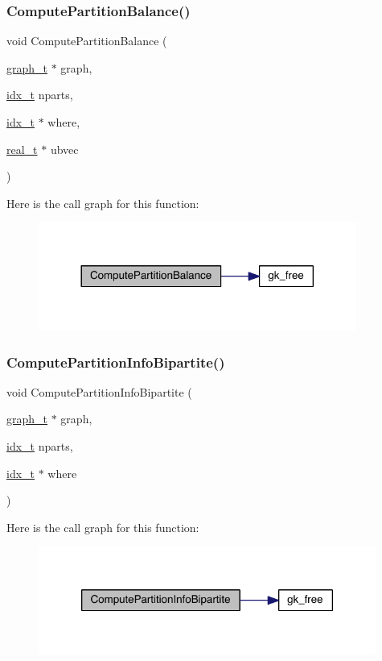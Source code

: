 \subsubsection{\texorpdfstring{Compute\+Partition\+Balance()}{ComputePartitionBalance()}}
{\footnotesize\ttfamily void Compute\+Partition\+Balance (\begin{DoxyParamCaption}\item[{\hyperlink{a00734}{graph\+\_\+t} $\ast$}]{graph,  }\item[{\hyperlink{a00876_aaa5262be3e700770163401acb0150f52}{idx\+\_\+t}}]{nparts,  }\item[{\hyperlink{a00876_aaa5262be3e700770163401acb0150f52}{idx\+\_\+t} $\ast$}]{where,  }\item[{\hyperlink{a00876_a1924a4f6907cc3833213aba1f07fcbe9}{real\+\_\+t} $\ast$}]{ubvec }\end{DoxyParamCaption})}

Here is the call graph for this function\+:\nopagebreak
\begin{figure}[H]
\begin{center}
\leavevmode
\includegraphics[width=296pt]{a00963_aaae826710f48d49c2961c5507760e6f0_cgraph}
\end{center}
\end{figure}
\mbox{\label{a00963_a8f9b0cf2c2f1b208f0947f471da6ab04}} 
\subsubsection{\texorpdfstring{Compute\+Partition\+Info\+Bipartite()}{ComputePartitionInfoBipartite()}}
{\footnotesize\ttfamily void Compute\+Partition\+Info\+Bipartite (\begin{DoxyParamCaption}\item[{\hyperlink{a00734}{graph\+\_\+t} $\ast$}]{graph,  }\item[{\hyperlink{a00876_aaa5262be3e700770163401acb0150f52}{idx\+\_\+t}}]{nparts,  }\item[{\hyperlink{a00876_aaa5262be3e700770163401acb0150f52}{idx\+\_\+t} $\ast$}]{where }\end{DoxyParamCaption})}

Here is the call graph for this function\+:\nopagebreak
\begin{figure}[H]
\begin{center}
\leavevmode
\includegraphics[width=314pt]{a00963_a8f9b0cf2c2f1b208f0947f471da6ab04_cgraph}
\end{center}
\end{figure}
